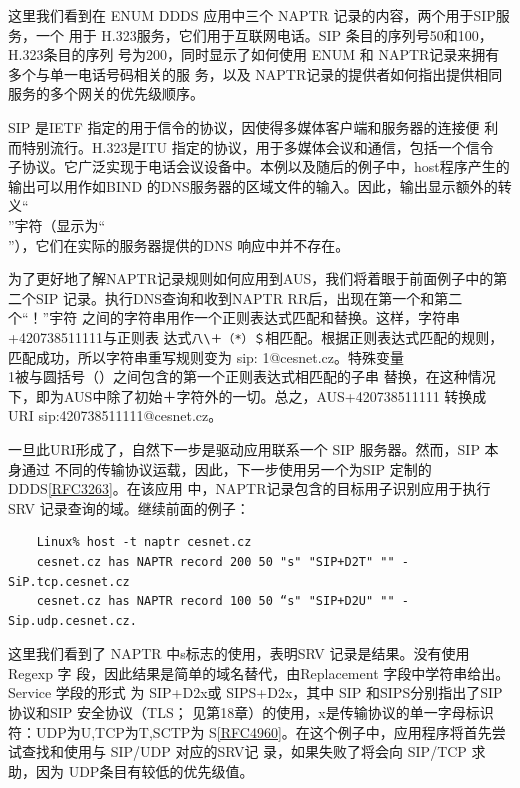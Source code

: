 这里我们看到在 ENUM DDDS 应用中三个 NAPTR 记录的内容，两个用于SIP服务，一个
用于 H.323服务，它们用于互联网电话。SIP 条目的序列号50和100，H.323条目的序列
号为200，同时显示了如何使用 ENUM 和 NAPTR记录来拥有多个与单一电话号码相关的服
务，以及 NAPTR记录的提供者如何指出提供相同服务的多个网关的优先级顺序。

\begin{tcolorbox}
    SIP 是IETF 指定的用于信令的协议，因使得多媒体客户端和服务器的连接便
    利而特别流行。H.323是ITU 指定的协议，用于多媒体会议和通信，包括一个信令
    子协议。它广泛实现于电话会议设备中。本例以及随后的例子中，host程序产生的
    输出可以用作如BIND 的DNS服务器的区域文件的输入。因此，输出显示额外的转
    义“\\”宇符（显示为“\\”），它们在实际的服务器提供的DNS 响应中并不存在。
\end{tcolorbox}

为了更好地了解NAPTR记录规则如何应用到AUS，我们将着眼于前面例子中的第
二个SIP 记录。执行DNS查询和收到NAPTR RR后，出现在第一个和第二个“！”宇符
之间的字符串用作一个正则表达式匹配和替换。这样，字符串+420738511111与正则表
达式\verb|八\＋（*）＄|相匹配。根据正则表达式匹配的规则，匹配成功，所以字符串重写规则变为
sip: 1@cesnet.cz。特殊变量\\1被与圆括号（）之间包含的第一个正则表达式相匹配的子串
替换，在这种情况下，即为AUS中除了初始＋字符外的一切。总之，AUS+420738511111
转换成 URI sip:420738511111@cesnet.cz。

一旦此URI形成了，自然下一步是驱动应用联系一个 SIP 服务器。然而，SIP 本身通过
不同的传输协议运载，因此，下一步使用另一个为SIP 定制的DDDS\href{https://www.rfc-editor.org/rfc/rfc3263}{[RFC3263]}。在该应用
中，NAPTR记录包含的目标用子识别应用于执行SRV 记录查询的域。继续前面的例子：

\begin{verbatim}
    Linux% host -t naptr cesnet.cz
    cesnet.cz has NAPTR record 200 50 "s" "SIP+D2T" "" -SiP.tcp.cesnet.cz
    cesnet.cz has NAPTR record 100 50 “s" "SIP+D2U" "" -Sip.udp.cesnet.cz.
\end{verbatim}

这里我们看到了 NAPTR 中s标志的使用，表明SRV 记录是结果。没有使用 Regexp 字
段，因此结果是简单的域名替代，由Replacement 字段中学符串给出。Service 学段的形式
为 SIP+D2x或 SIPS+D2x，其中 SIP 和SIPS分别指出了SIP 协议和SIP 安全协议（TLS；
见第18章）的使用，x是传输协议的单一字母标识符：UDP为U,TCP为T,SCTP为
S\href{https://www.rfc-editor.org/rfc/rfc4960}{[RFC4960]}。在这个例子中，应用程序将首先尝试查找和使用与 SIP/UDP 对应的SRV记
录，如果失败了将会向 SIP/TCP 求助，因为 UDP条目有较低的优先级值。

